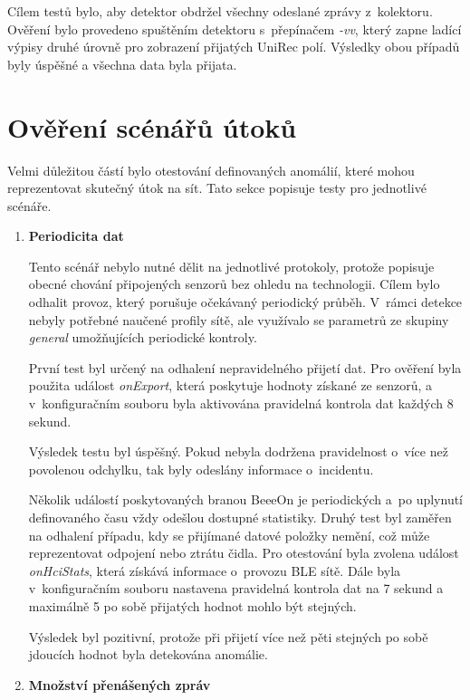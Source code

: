Cílem testů bylo, aby detektor obdržel všechny odeslané zprávy z~kolektoru. Ověření bylo provedeno
spuštěním detektoru s~přepínačem \textit{-vv}, který zapne ladící výpisy druhé úrovně pro zobrazení 
přijatých UniRec polí. Výsledky obou případů byly úspěšné a všechna data byla přijata.

\section{Ověření scénářů útoků} \label{testAttack}
Velmi důležitou částí bylo otestování definovaných anomálií, které mohou reprezentovat skutečný
útok na sít. Tato sekce popisuje testy pro jednotlivé scénáře.

  \begin{enumerate} [label=\textbf{S.\arabic*}]
    \item \textbf{Periodicita dat}
    
    Tento scénář nebylo nutné dělit na jednotlivé protokoly, protože popisuje obecné chování 
    připojených senzorů bez ohledu na technologii. Cílem bylo odhalit provoz, který porušuje
    očekávaný periodický průběh. V~rámci detekce nebyly potřebné naučené profily sítě, 
    ale využívalo se parametrů ze skupiny \textit{general} umožňujících periodické kontroly.
    
    První test byl určený na odhalení nepravidelného přijetí dat. Pro ověření byla použita událost
    \textit{onExport}, která poskytuje hodnoty získané ze senzorů, a v~konfiguračním souboru byla 
    aktivována pravidelná kontrola dat každých 8 sekund.
    
    Výsledek testu byl úspěšný. Pokud nebyla dodržena pravidelnost o~více než povolenou odchylku,  
    tak byly odeslány informace o~incidentu.
    
    Několik událostí poskytovaných branou BeeeOn je periodických a~po uplynutí definovaného
    času vždy odešlou dostupné statistiky. Druhý test byl zaměřen na odhalení případu, kdy se 
    přijímané datové položky nemění, což může reprezentovat odpojení nebo ztrátu čidla. Pro 
    otestování byla zvolena událost \textit{onHciStats}, která získává informace o~provozu BLE sítě. 
    Dále byla v~konfiguračním souboru nastavena pravidelná kontrola dat na 7 sekund a maximálně 
    5 po sobě přijatých hodnot mohlo být stejných. 
    
    Výsledek byl pozitivní, protože při přijetí více než pěti stejných po sobě jdoucích
    hodnot byla detekována anomálie.
    
    \item \textbf{Množství přenášených zpráv}
    

\end{enumerate}
